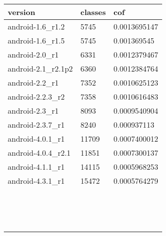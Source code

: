 \begin{tabular}{|l|l|l|}
\hline
version&classes&cof\\
\hline
android-1.6\_r1.2&5745&0.0013695147\\
\hline
android-1.6\_r1.5&5745&0.001369545\\
\hline
android-2.0\_r1&6331&0.0012379467\\
\hline
android-2.1\_r2.1p2&6360&0.0012384764\\
\hline
android-2.2\_r1&7352&0.0010625123\\
\hline
android-2.2.3\_r2&7358&0.0010616483\\
\hline
android-2.3\_r1&8093&0.0009540904\\
\hline
android-2.3.7\_r1&8240&0.000937113\\
\hline
android-4.0.1\_r1&11709&0.0007400012\\
\hline
android-4.0.4\_r2.1&11851&0.0007300137\\
\hline
android-4.1.1\_r1&14115&0.0005968253\\
\hline
android-4.3.1\_r1&15472&0.0005764279\\
\hline
&&\\
\hline
&&\\
\hline
&&\\
\hline
&&\\
\hline
&&\\
\hline
&&\\
\hline
&&\\
\hline
&&\\
\hline
&&\\
\hline
&&\\
\hline
&&\\
\hline
&&\\
\hline
&&\\
\hline
&&\\
\hline
&&\\
\hline
\end{tabular}
